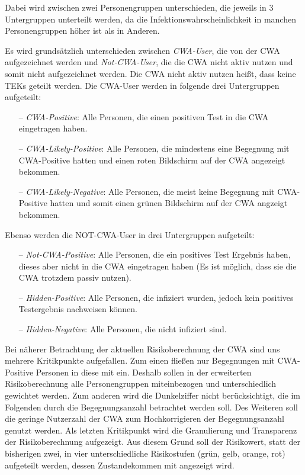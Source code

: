 \documentclass[conference,compsoc]{IEEEtran}
\begin{document}
Dabei wird zwischen zwei Personengruppen unterschieden, die jeweils in 3 Untergruppen unterteilt werden, 
da die Infektionswahrscheinlichkeit in manchen Personengruppen höher ist als in Anderen.

Es wird grundsätzlich unterschieden zwischen \textit{CWA-User}, die von der CWA aufgezeichnet werden und \textit{Not-CWA-User}, 
die die CWA nicht aktiv nutzen und somit nicht aufgezeichnet werden. Die CWA nicht aktiv nutzen heißt, dass keine TEKs geteilt werden.
Die CWA-User werden in folgende drei Untergruppen aufgeteilt:
\begin{itemize}
\item[--]\textit{CWA-Positive}: Alle Personen, die einen positiven Test in die CWA eingetragen haben.
\item[--]\textit{CWA-Likely-Positive}: Alle Personen, die mindestens eine Begegnung mit CWA-Positive hatten und einen roten Bildschirm auf der CWA angezeigt bekommen.
\item[--]\textit{CWA-Likely-Negative}: Alle Personen, die meist keine Begegnung mit CWA-Positive hatten und somit einen grünen Bildschirm auf der CWA angzeigt bekommen.
\end{itemize}
Ebenso werden die NOT-CWA-User in drei Untergruppen aufgeteilt: 
\begin{itemize}
\item[--]\textit{Not-CWA-Positive}: Alle Personen, die ein positives Test Ergebnis haben, dieses aber nicht in die CWA eingetragen haben (Es ist möglich, dass sie die CWA trotzdem passiv nutzen).
\item[--]\textit{Hidden-Positive}: Alle Personen, die infiziert wurden, jedoch kein positives Testergebnis nachweisen können. 
\item[--]\textit{Hidden-Negative}: Alle Personen, die nicht infiziert sind.
\end{itemize}

Bei näherer Betrachtung der aktuellen Risikoberechnung der CWA sind uns mehrere Kritikpunkte aufgefallen.
Zum einen fließen nur Begegnungen mit CWA-Positive Personen in diese mit ein.
Deshalb sollen in der erweiterten Risikoberechnung alle Personengruppen miteinbezogen und unterschiedlich gewichtet werden.
Zum anderen wird die Dunkelziffer nicht berücksichtigt, die im Folgenden durch die Begegnungsanzahl betrachtet werden soll.
Des Weiteren soll die geringe Nutzerzahl der CWA zum Hochkorrigieren der Begegnungsanzahl genutzt werden.
Als letzten Kritikpunkt wird die Granulierung und Transparenz der Risikoberechnung aufgezeigt. 
Aus diesem Grund soll der Risikowert, statt der bisherigen zwei, in vier unterschiedliche Risikostufen (grün, gelb, orange, rot) aufgeteilt werden, dessen Zustandekommen mit angezeigt wird.
\end{document}
